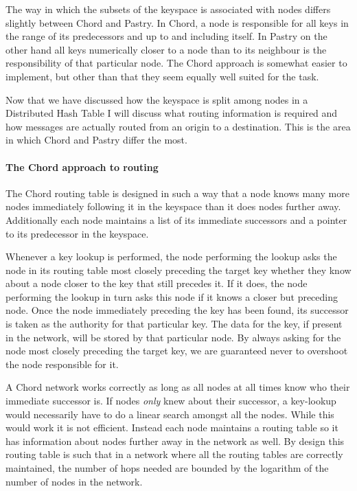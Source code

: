 The way in which the subsets of the keyspace is associated with nodes differs slightly between Chord and Pastry. In Chord, a node is responsible for all keys in the range of its predecessors and up to and including itself. In Pastry on the other hand all keys numerically closer to a node than to its neighbour is the responsibility of that particular node. The Chord approach is somewhat easier to implement, but other than that they seem equally well suited for the task.


Now that we have discussed how the keyspace is split among nodes in a Distributed Hash Table I will discuss what routing information is required and how messages are actually routed from an origin to a destination. This is the area in which Chord and Pastry differ the most.

\paragraph{The Chord approach to routing}
The Chord routing table is designed in such a way that a node knows many more nodes immediately following it in the keyspace than it does nodes further away. Additionally each node maintains a list of its immediate successors and a pointer to its predecessor in the keyspace.

Whenever a key lookup is performed, the node performing the lookup asks the node in its routing table most closely preceding the target key whether they know about a node closer to the key that still precedes it. If it does, the node performing the lookup in turn asks this node if it knows a closer but preceding node. Once the node immediately preceding the key has been found, its successor is taken as the authority for that particular key.
The data for the key, if present in the network, will be stored by that particular node.
By always asking for the node most closely preceding the target key, we are guaranteed never to overshoot the node responsible for it.

A Chord network works correctly as long as all nodes at all times know who their immediate successor is. If nodes \emph{only} knew about their successor, a key-lookup would necessarily have to do a linear search amongst all the nodes. While this would work it is not efficient. Instead each node maintains a routing table so it has information about nodes further away in the network as well. By design this routing table is such that in a network where all the routing tables are correctly maintained, the number of hops needed are bounded by the logarithm of the number of nodes in the network.


